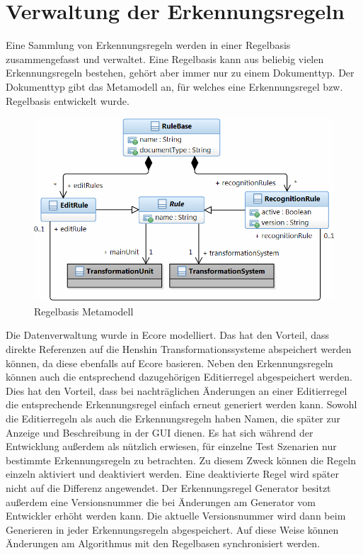 \chapter{Verwaltung der Erkennungsregeln}
\label{verwaltung}

Eine Sammlung von Erkennungsregeln werden in einer Regelbasis zusammengefasst und verwaltet. Eine
Regelbasis kann aus beliebig vielen Erkennungsregeln bestehen, gehört aber immer nur zu einem
Dokumenttyp. Der Dokumenttyp gibt das Metamodell an, für welches eine Erkennungsregel bzw.
Regelbasis entwickelt wurde.

\begin{figure}[htb]
  \centering \includegraphics[scale=0.6]{images/rulebase_metamodel.png}
  \caption{Regelbasis Metamodell}
  \label{fig:rulbase_metamodel}
\end{figure}

Die Datenverwaltung wurde in Ecore modelliert. Das hat den Vorteil, dass direkte Referenzen auf die
Henshin Transformationssysteme abspeichert werden können, da diese ebenfalls auf Ecore basieren.
Neben den Erkennungsregeln können auch die entsprechend dazugehörigen Editierregel abgespeichert werden. Dies
hat den Vorteil, dass bei nachträglichen Änderungen an einer Editierregel die entsprechende
Erkennungsregel einfach erneut generiert werden kann. Sowohl die Editierregeln als auch die
Erkennungsregeln haben Namen, die später zur Anzeige und Beschreibung in der GUI dienen. Es hat sich
während der Entwicklung außerdem als nützlich erwiesen, für einzelne Test Szenarien nur bestimmte
Erkennungsregeln zu betrachten. Zu diesem Zweck können die Regeln einzeln aktiviert und deaktiviert
werden. Eine deaktivierte Regel wird später nicht auf die Differenz angewendet. Der Erkennungsregel
Generator besitzt außerdem eine Versionsnummer die bei Änderungen am Generator vom Entwickler erhöht
werden kann. Die aktuelle Versionsnummer wird dann beim Generieren in jeder Erkennungsregeln
abgespeichert. Auf diese Weise können Änderungen am Algorithmus mit den Regelbasen synchronisiert
werden.

